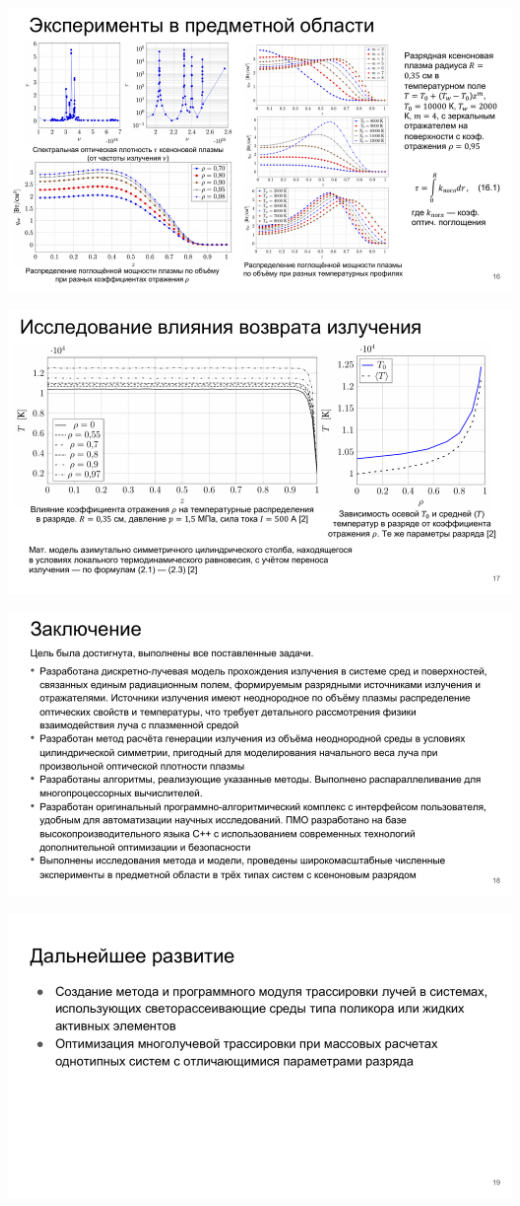 \includegraphics[angle=90,origin=c]{inc/img/presentation-16}

\includegraphics[angle=90,origin=c]{inc/img/presentation-17}

\includegraphics[angle=90,origin=c]{inc/img/presentation-18}

\includegraphics[angle=90,origin=c]{inc/img/presentation-19}

